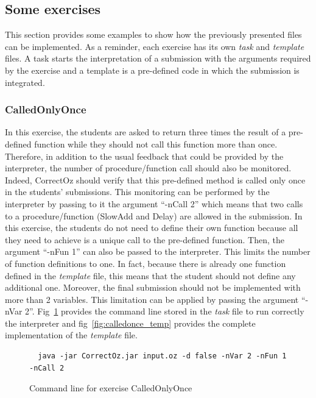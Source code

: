 \documentclass[11pt,a4paper,twoside,openright]{report}
\begin{document}
\subsection{Some exercises}

This section provides some examples to show how the previously presented files 
can be implemented. As a reminder, each exercise has its own \textit{task} and 
\textit{template} files. A task starts the interpretation of a submission with 
the arguments required by the exercise and a template is a pre-defined code in 
which the submission is integrated.


\subsubsection{CalledOnlyOnce}
In this exercise, the students are asked to return three times the result of a 
pre-defined function while they should not call this function more than once. 
Therefore, in addition to the usual feedback that could be provided by the 
interpreter, the number of procedure/function call should also be monitored. Indeed, CorrectOz 
should verify that this pre-defined method is called only once in the 
students' submissions. This monitoring can be performed by the interpreter by 
passing to it the argument \enquote{-nCall 2} which means that two calls to 
a procedure/function (SlowAdd and Delay) are allowed in the submission. In this exercise, the students do not 
need to define their own function because all they need to achieve is a 
unique call to the pre-defined function. Then, the argument 
\enquote{-nFun 1} can also be passed to the interpreter. This limits the 
number of function definitions to one. In fact, because there is already one 
function defined in the \textit{template} file, this means that the student 
should not define any additional one. Moreover, the final submission 
should not be implemented with more than 2 variables. This limitation can be 
applied by passing the argument 
\enquote{-nVar 2}. Fig~\ref{fig:calledonce} provides the command line stored in 
the \textit{task} file to run correctly the interpreter and 
fig~\ref{fig:calledonce_temp} provides the complete implementation of the 
\textit{template} file.

\begin{figure}[!ht]
 \begin{lstlisting}
  java -jar CorrectOz.jar input.oz -d false -nVar 2 -nFun 1 -nCall 2
  \end{lstlisting}
 \caption{Command line for exercise CalledOnlyOnce}
 \label{fig:calledonce}
\end{figure}
\end{document}
